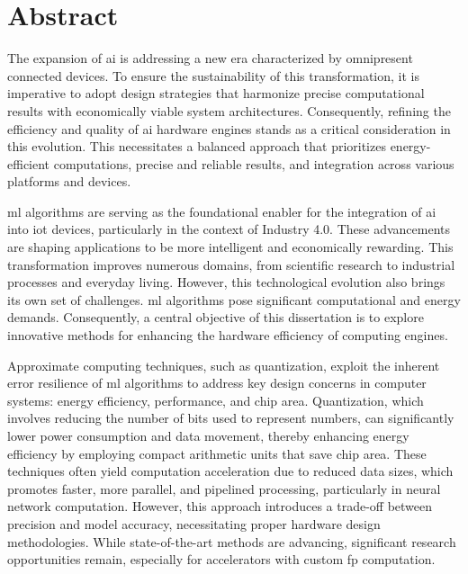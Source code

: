 \chapter*{Abstract}
\thispagestyle{empty}

The expansion of \gls{ai} is addressing a new era characterized by omnipresent connected devices. To ensure the sustainability of this transformation, it is imperative to adopt design strategies that harmonize precise computational results with economically viable system architectures. Consequently, refining the efficiency and quality of \gls{ai} hardware engines stands as a critical consideration in this evolution. This necessitates a balanced approach that prioritizes energy-efficient computations, precise and reliable results, and integration across various platforms and devices.

\gls{ml} algorithms are serving as the foundational enabler for the integration of \gls{ai} into \gls{iot} devices, particularly in the context of Industry 4.0. These advancements are shaping applications to be more intelligent and economically rewarding. This transformation improves numerous domains, from scientific research to industrial processes and everyday living. However, this technological evolution also brings its own set of challenges. \gls{ml} algorithms pose significant computational and energy demands. Consequently, a central objective of this dissertation is to explore innovative methods for enhancing the hardware efficiency of computing engines.

Approximate computing techniques, such as quantization, exploit the inherent error resilience of \gls{ml} algorithms to address key design concerns in computer systems: energy efficiency, performance, and chip area. Quantization, which involves reducing the number of bits used to represent numbers, can significantly lower power consumption and data movement, thereby enhancing energy efficiency by employing compact arithmetic units that save chip area. These techniques often yield computation acceleration due to reduced data sizes, which promotes faster, more parallel, and pipelined processing, particularly in neural network computation. However, this approach introduces a trade-off between precision and model accuracy, necessitating proper hardware design methodologies. While state-of-the-art methods are advancing, significant research opportunities remain, especially for accelerators with custom \gls{fp} computation.

